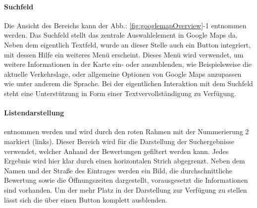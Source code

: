 \documentclass[../Bachelorarbeit.tex]{subfiles}
\begin{document}
\paragraph{Suchfeld}
\label{gmapsSearch}
Die Ansicht des Bereichs  kann der Abb.: \ref{fig:googlemapOverview}-1 entnommen werden.
Das Suchfeld stellt das zentrale Auswahlelement in Google Maps da. 
Neben dem eigentlich Textfeld, wurde an dieser Stelle auch ein Button integriert, mit dessen Hilfe ein weiteres Menü erscheint. 
Dieses Menü wird verwendet, um weitere Informationen  in der Karte ein- oder auszublenden, wie Beispielsweise die aktuelle Verkehrslage, oder allgemeine Optionen von Google Maps anzupassen wie unter anderem die Sprache.
Bei der eigentlichen Interaktion mit dem Suchfeld steht eine Unterstützung in Form einer Textvervollständigung zu Verfügung. 

\paragraph{Listendarstellung}
\label{gmapsList}
 entnommen werden und wird durch den roten Rahmen mit der Nummerierung 2 markiert (links).
Dieser Bereich wird für die Darstellung der Suchergebnisse verwendet, welcher Anhand der Bewertungen gefiltert werden kann.
Jedes Ergebnis wird hier klar durch einen horizontalen Strich abgegrenzt.
Neben dem Namen und der Straße des Eintrages werden ein Bild, die durchschnittliche Bewertung sowie die Öffnungszeiten dargestellt, vorausgesetzt die Informationen sind vorhanden.
Um der  mehr Platz in der Darstellung zur Verfügung zu stellen lässt sich die  über einen Button komplett ausblenden. 
\end{document}
